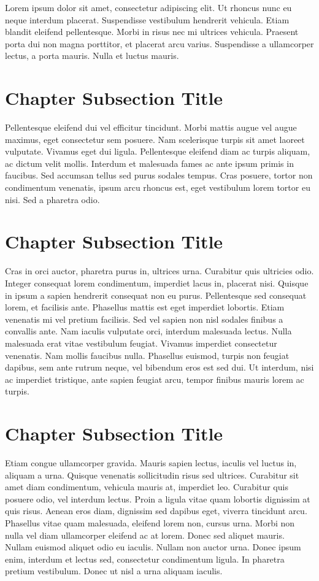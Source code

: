 Lorem ipsum dolor sit amet, consectetur adipiscing elit. Ut rhoncus nunc eu neque interdum placerat. Suspendisse vestibulum hendrerit vehicula. Etiam blandit eleifend pellentesque. Morbi in risus nec mi ultrices vehicula. Praesent porta dui non magna porttitor, et placerat arcu varius. Suspendisse a ullamcorper lectus, a porta mauris. Nulla et luctus mauris.

\section{Chapter Subsection Title}
Pellentesque eleifend dui vel efficitur tincidunt. Morbi mattis augue vel augue maximus, eget consectetur sem posuere. Nam scelerisque turpis sit amet laoreet vulputate. Vivamus eget dui ligula. Pellentesque eleifend diam ac turpis aliquam, ac dictum velit mollis. Interdum et malesuada fames ac ante ipsum primis in faucibus. Sed accumsan tellus sed purus sodales tempus. Cras posuere, tortor non condimentum venenatis, ipsum arcu rhoncus est, eget vestibulum lorem tortor eu nisi. Sed a pharetra odio.

\section{Chapter Subsection Title}
Cras in orci auctor, pharetra purus in, ultrices urna. Curabitur quis ultricies odio. Integer consequat lorem condimentum, imperdiet lacus in, placerat nisi. Quisque in ipsum a sapien hendrerit consequat non eu purus. Pellentesque sed consequat lorem, et facilisis ante. Phasellus mattis est eget imperdiet lobortis. Etiam venenatis mi vel pretium facilisis. Sed vel sapien non nisl sodales finibus a convallis ante. Nam iaculis vulputate orci, interdum malesuada lectus. Nulla malesuada erat vitae vestibulum feugiat. Vivamus imperdiet consectetur venenatis. Nam mollis faucibus nulla. Phasellus euismod, turpis non feugiat dapibus, sem ante rutrum neque, vel bibendum eros est sed dui. Ut interdum, nisi ac imperdiet tristique, ante sapien feugiat arcu, tempor finibus mauris lorem ac turpis.

\section{Chapter Subsection Title}
Etiam congue ullamcorper gravida. Mauris sapien lectus, iaculis vel luctus in, aliquam a urna. Quisque venenatis sollicitudin risus sed ultrices. Curabitur sit amet diam condimentum, vehicula mauris at, imperdiet leo. Curabitur quis posuere odio, vel interdum lectus. Proin a ligula vitae quam lobortis dignissim at quis risus. Aenean eros diam, dignissim sed dapibus eget, viverra tincidunt arcu. Phasellus vitae quam malesuada, eleifend lorem non, cursus urna. Morbi non nulla vel diam ullamcorper eleifend ac at lorem. Donec sed aliquet mauris. Nullam euismod aliquet odio eu iaculis. Nullam non auctor urna. Donec ipsum enim, interdum et lectus sed, consectetur condimentum ligula. In pharetra pretium vestibulum. Donec ut nisl a urna aliquam iaculis.

